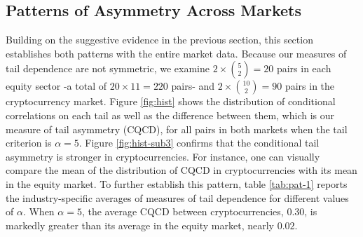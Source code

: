 \documentclass{article}
\begin{document}
\subsection{Patterns of Asymmetry Across Markets}\label{sec:patt}
Building on the suggestive evidence in the previous section, this section establishes both patterns with the entire market data. Because our measures of tail dependence are not symmetric, we examine \(2 \times \binom{5}{2} = 20\) pairs in each equity sector -a total of $20 \times 11 = 220$ pairs- and \(2 \times \binom{10}{2} = 90\) pairs in the cryptocurrency market. Figure \ref{fig:hist} shows the distribution of conditional correlations on each tail as well as the difference between them, which is our measure of tail asymmetry (CQCD), for all pairs in both markets when the tail criterion is $\alpha = 5$. Figure \ref{fig:hist-sub3} confirms that the conditional tail asymmetry is stronger in cryptocurrencies. For instance, one can visually compare the mean of the distribution of CQCD in cryptocurrencies with its mean in the equity market. To further establish this pattern, table \ref{tab:pat-1} reports the industry-specific averages of measures of tail dependence for different values of $\alpha$. When $\alpha = 5$, the average CQCD between cryptocurrencies, $0.30$, is markedly greater than its average in the equity market, nearly $0.02$.
\end{document}
